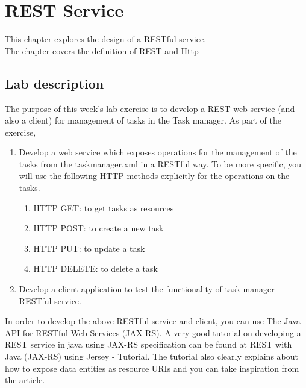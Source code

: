 \chapter{REST Service}
\minitoc
This chapter explores the design of a RESTful service.\\
The chapter covers the definition of REST and Http

\section{Lab description}
\label{rest_description}
The purpose of this week's lab exercise is to develop a REST web service (and also a client) for management of tasks in the Task manager. As part of the exercise,
\begin{enumerate}
 \item Develop a web service which exposes operations  for the management of the tasks from the taskmanager.xml in a RESTful way. To be more specific, you will use the following HTTP methods explicitly for the operations on the tasks.\\
 \begin{enumerate}
     \item HTTP GET: to get tasks as resources
     \item HTTP POST: to create a new task
     \item HTTP PUT: to update a task
     \item HTTP DELETE: to delete a task
 \end{enumerate}
 \item Develop a client application to test the functionality of task manager RESTful service.
\end{enumerate}
In order to develop the above RESTful service and client, you can use The Java API for RESTful Web Services (JAX-RS).  A very good tutorial on developing a REST service in java using JAX-RS specification  can be found at REST with Java (JAX-RS) using Jersey - Tutorial. The tutorial also clearly explains about how to expose data entities as resource URIs and you can take inspiration from the article.

